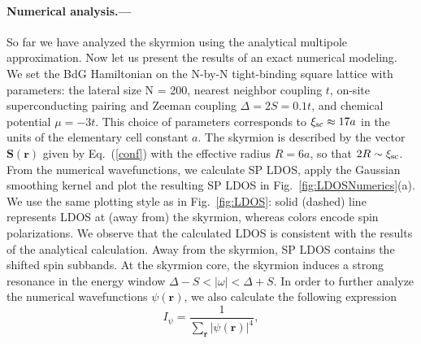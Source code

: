 \documentclass[twocolumn,showpacs,floatfix,longbibliography]{revtex4-1}
\begin{document}
\paragraph*{Numerical analysis.---} \label{sec:numerics}
So far we have analyzed the skyrmion using the analytical multipole approximation. Now let us present the results of an exact numerical modeling. We set the BdG Hamiltonian on the N-by-N tight-binding square lattice with parameters: the lateral size N = 200, nearest neighbor coupling $t$, on-site superconducting pairing and Zeeman coupling $\Delta=2S=0.1t$, and chemical potential $\mu = -3t$. This choice of parameters corresponds to $\xi_{\rm sc}\approx 17 a$ in the units of the elementary cell constant $a$. The skyrmion is described by the vector $\bm S(\bm r)$ given by Eq.~(\ref{conf}) with the effective radius $R = 6a$, so that $2R\sim \xi_{\rm sc}$. From the numerical wavefunctions, we calculate SP LDOS, apply the Gaussian smoothing kernel and plot the resulting SP LDOS in Fig.~\ref{fig:LDOSNumerics}(a). We use the same plotting style as in Fig.~\ref{fig:LDOS}: solid (dashed) line represents LDOS at (away from) the skyrmion, whereas colors encode spin polarizations. We observe that the calculated LDOS is consistent with the results of the analytical calculation. Away from the skyrmion, SP LDOS contains the shifted spin subbands. At the skyrmion core, the skyrmion induces a strong resonance in the energy window $\Delta-S<|\omega|<\Delta+S$. In order to further analyze the numerical wavefunctions $\psi(\bm r)$, we also calculate the following expression
\begin{equation}
	I_\psi =\frac{1}{\sum_{\bm r} |\psi(\bm r)|^4},
	\label{I}
\end{equation}
\end{document}
